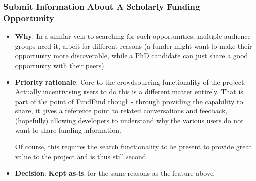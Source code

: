 \subsubsection{Submit Information About A Scholarly Funding Opportunity}
\begin{itemize}
 \item \textbf{Why}: In a similar vein to searching for such opportunities, multiple audience groups need it, albeit for different  reasons (a funder might want to make their opportunity more discoverable, while a PhD candidate can just share a good opportunity with their peers).
 \item \textbf{Priority rationale}: Core to the crowdsourcing functionality of the project. Actually incentivising users to do this is a different matter entirely. That is part of the point of FundFind though - through providing the capability to share, it gives a reference point to related conversations and feedback, (hopefully) allowing developers to understand why the various users do not want to share funding information.
 
 Of course, this requires the search functionality to be present to provide great value to the project and is thus still second.
 \item \textbf{Decision}: \textbf{Kept as-is}, for the same reasons as the feature above.
 
\end{itemize}

